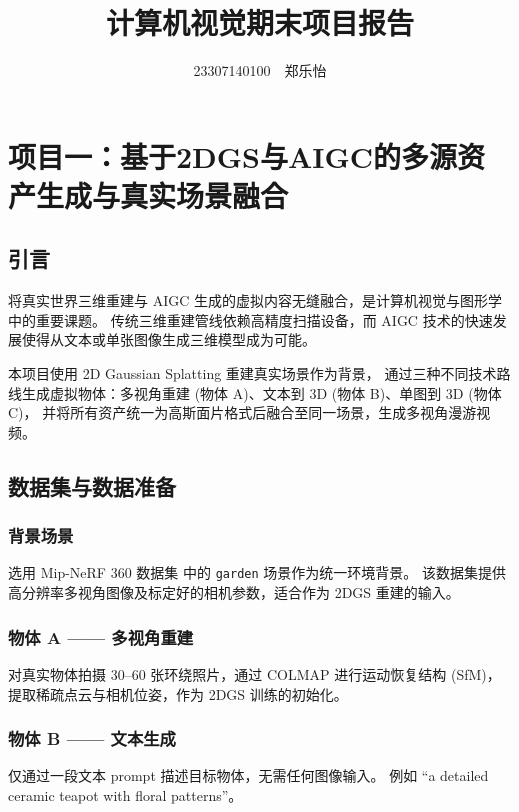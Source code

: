 \documentclass[12pt,a4paper]{ctexart}
\title{{\Huge\bfseries 计算机视觉期末项目报告}}
\author{23307140100\ \ 郑乐怡}
\date{}
\begin{document}
\maketitle
\thispagestyle{empty}

\newpage
\tableofcontents
\newpage



\section{项目一：基于2DGS与AIGC的多源资产生成与真实场景融合}

\subsection{引言}

将真实世界三维重建与 AIGC 生成的虚拟内容无缝融合，是计算机视觉与图形学中的重要课题。
传统三维重建管线依赖高精度扫描设备，而 AIGC 技术的快速发展使得从文本或单张图像生成三维模型成为可能。

本项目使用 2D Gaussian Splatting\cite{huang20242dgs} 重建真实场景作为背景，
通过三种不同技术路线生成虚拟物体：多视角重建 (物体 A)、文本到 3D (物体 B)、单图到 3D (物体 C)，
并将所有资产统一为高斯面片格式后融合至同一场景，生成多视角漫游视频。

\subsection{数据集与数据准备}

\subsubsection{背景场景}
选用 Mip-NeRF 360 数据集\cite{barron2022mipnerf360} 中的 \texttt{garden} 场景作为统一环境背景。
该数据集提供高分辨率多视角图像及标定好的相机参数，适合作为 2DGS 重建的输入。

\subsubsection{物体 A —— 多视角重建}
对真实物体拍摄 30--60 张环绕照片，通过 COLMAP\cite{schoenberger2016sfm} 进行运动恢复结构 (SfM)，
提取稀疏点云与相机位姿，作为 2DGS 训练的初始化。

\subsubsection{物体 B —— 文本生成}
仅通过一段文本 prompt 描述目标物体，无需任何图像输入。
例如 ``a detailed ceramic teapot with floral patterns''。
\end{document}
